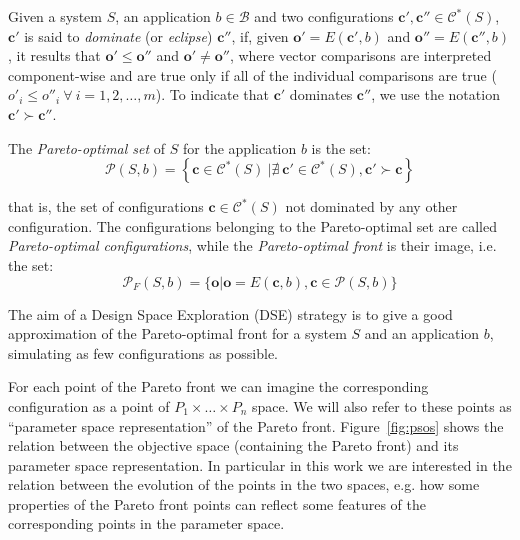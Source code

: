 Given a system $S$, an application $b \in \mathcal{B}$ and two
configurations $\mathbf{c}', \mathbf{c}'' \in \mathcal{C}^*(S)$,
$\mathbf{c}'$ is said to {\em dominate} (or {\em eclipse})
$\mathbf{c}''$, if, given $\mathbf{o}'=E(\mathbf{c}', b)$ and
$\mathbf{o}''=E(\mathbf{c}'', b)$, it results that $\mathbf{o}'
\leq \mathbf{o}''$ and $\mathbf{o}' \neq \mathbf{o}''$, where
vector comparisons are interpreted component-wise and are true
only if all of the individual comparisons are true ($o'_i \leq
o''_i \ \forall \ i = 1,2,\ldots,m$). To indicate that 
$\mathbf{c}'$ dominates $\mathbf{c}''$, we use the notation
$\mathbf{c}' \succ \mathbf{c}''$.

\begin{definition}
\label{pers02.def:Pareto-set}
The {\em Pareto-optimal set} of $S$ for the application $b$ is the
set:
\[ \mathcal{P}(S,b) = \left\{ \mathbf{c} \in \mathcal{C}^*(S) \ | \nexists \ \mathbf{c}' \in \mathcal{C}^*(S), \mathbf{c}' \succ \mathbf{c} \right\} \]
\end{definition}
that is, the set of configurations $\mathbf{c} \in
\mathcal{C}^*(S)$ not dominated by any other configuration.
The configurations belonging to the Pareto-optimal set are called \emph{Pareto-optimal configurations}, while the {\em Pareto-optimal front} is their image, i.e. the set:
\[ \mathcal{P}_{F}(S,b) = \{ \mathbf{o} | \mathbf{o} = E(\mathbf{c},b), \mathbf{c} \in \mathcal{P}(S,b) \} \]

The aim of a Design Space Exploration (DSE) strategy is to give a
good approximation of the Pareto-optimal front for a system $S$ and an
application $b$, simulating as few configurations as possible.




For each point of the Pareto front we can imagine the corresponding
configuration as a point of $P_{1}\times\dots\times P_{n}$
space. We will also refer to these points as ``parameter space representation'' of the
Pareto front. Figure~\ref{fig:psos} shows the relation between the objective space
(containing the Pareto front) and its parameter space representation.
In particular in this work we are interested in the relation between
the evolution of the points in the two spaces, e.g. how some
properties of the Pareto front points can reflect some features of the
corresponding points in the parameter space.

